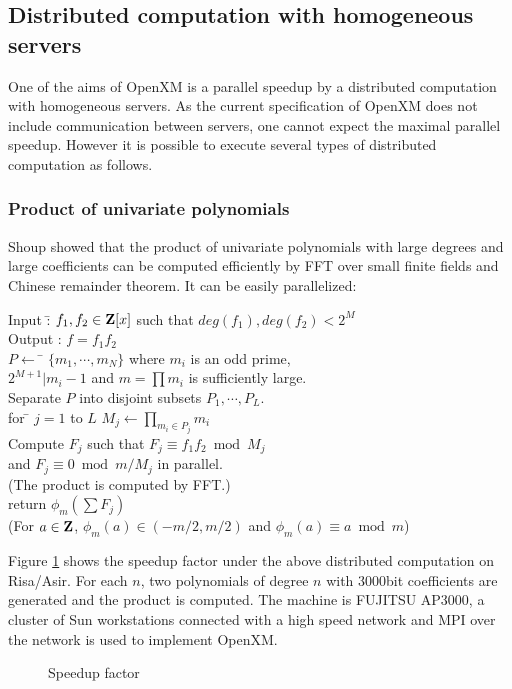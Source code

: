 
\subsection{Distributed computation with homogeneous servers}
\label{section:homog}

One of the aims of OpenXM is a parallel speedup by a distributed computation
with homogeneous servers. As the current specification of OpenXM does
not include communication between servers, one cannot expect
the maximal parallel speedup. However it is possible to execute
several types of distributed computation as follows.

\subsubsection{Product of univariate polynomials}

Shoup \cite{Shoup} showed that the product of univariate polynomials
with large degrees and large coefficients can be computed efficiently
by FFT over small finite fields and Chinese remainder theorem.
It can be easily parallelized:

\begin{tabbing}
Input :\= $f_1, f_2 \in {\bf Z}[x]$ such that $deg(f_1), deg(f_2) < 2^M$\\
Output : $f = f_1f_2$ \\
$P \leftarrow$ \= $\{m_1,\cdots,m_N\}$ where $m_i$ is an odd prime, \\
\> $2^{M+1}|m_i-1$ and $m=\prod m_i $ is sufficiently large. \\
Separate $P$ into disjoint subsets $P_1, \cdots, P_L$.\\
for \= $j=1$ to $L$ $M_j \leftarrow \prod_{m_i\in P_j} m_i$\\
Compute $F_j$ such that $F_j \equiv f_1f_2 \bmod M_j$\\
\> and $F_j \equiv 0 \bmod m/M_j$ in parallel.\\
\> (The product is computed by FFT.)\\
return $\phi_m(\sum F_j)$\\
(For $a \in {\bf Z}$, $\phi_m(a) \in (-m/2,m/2)$ and $\phi_m(a)\equiv a \bmod m$)
\end{tabbing}

Figure \ref{speedup}
shows the speedup factor under the above distributed computation
on Risa/Asir. For each $n$, two polynomials of degree $n$
with 3000bit coefficients are generated and the product is computed.
The machine is FUJITSU AP3000,
a cluster of Sun workstations connected with a high speed network 
and MPI over the network is used to implement OpenXM.
\begin{figure}[htbp]
\epsfxsize=8.5cm
\caption{Speedup factor}
\label{speedup}
\end{figure}

